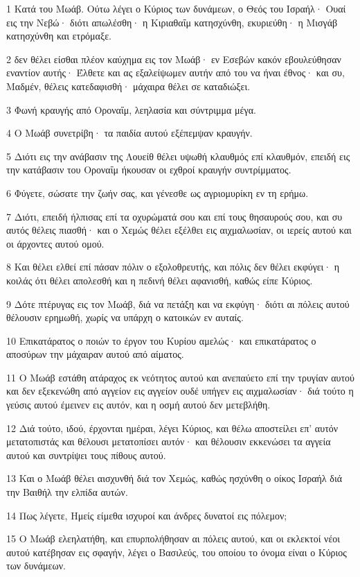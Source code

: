 \par 1 Κατά του Μωάβ. Ούτω λέγει ο Κύριος των δυνάμεων, ο Θεός του Ισραήλ· Ουαί εις την Νεβώ· διότι απωλέσθη· η Κιριαθαΐμ κατησχύνθη, εκυριεύθη· η Μισγάβ κατησχύνθη και ετρόμαξε.
\par 2 δεν θέλει είσθαι πλέον καύχημα εις τον Μωάβ· εν Εσεβών κακόν εβουλεύθησαν εναντίον αυτής· Έλθετε και ας εξαλείψωμεν αυτήν από του να ήναι έθνος· και συ, Μαδμέν, θέλεις κατεδαφισθή· μάχαιρα θέλει σε καταδιώξει.
\par 3 Φωνή κραυγής από Οροναΐμ, λεηλασία και σύντριμμα μέγα.
\par 4 Ο Μωάβ συνετρίβη· τα παιδία αυτού εξέπεμψαν κραυγήν.
\par 5 Διότι εις την ανάβασιν της Λουείθ θέλει υψωθή κλαυθμός επί κλαυθμόν, επειδή εις την κατάβασιν του Οροναΐμ ήκουσαν οι εχθροί κραυγήν συντρίμματος.
\par 6 Φύγετε, σώσατε την ζωήν σας, και γένεσθε ως αγριομυρίκη εν τη ερήμω.
\par 7 Διότι, επειδή ήλπισας επί τα οχυρώματά σου και επί τους θησαυρούς σου, και συ αυτός θέλεις πιασθή· και ο Χεμώς θέλει εξέλθει εις αιχμαλωσίαν, οι ιερείς αυτού και οι άρχοντες αυτού ομού.
\par 8 Και θέλει ελθεί επί πάσαν πόλιν ο εξολοθρευτής, και πόλις δεν θέλει εκφύγει· η κοιλάς ότι θέλει απολεσθή και η πεδινή θέλει αφανισθή, καθώς είπε Κύριος.
\par 9 Δότε πτέρυγας εις τον Μωάβ, διά να πετάξη και να εκφύγη· διότι αι πόλεις αυτού θέλουσιν ερημωθή, χωρίς να υπάρχη ο κατοικών εν αυταίς.
\par 10 Επικατάρατος ο ποιών το έργον του Κυρίου αμελώς· και επικατάρατος ο αποσύρων την μάχαιραν αυτού από αίματος.
\par 11 Ο Μωάβ εστάθη ατάραχος εκ νεότητος αυτού και ανεπαύετο επί την τρυγίαν αυτού και δεν εξεκενώθη από αγγείον εις αγγείον ουδέ υπήγεν εις αιχμαλωσίαν· διά τούτο η γεύσις αυτού έμεινεν εις αυτόν, και η οσμή αυτού δεν μετεβλήθη.
\par 12 Διά τούτο, ιδού, έρχονται ημέραι, λέγει Κύριος, και θέλω αποστείλει επ' αυτόν μετατοπιστάς και θέλουσι μετατοπίσει αυτόν· και θέλουσιν εκκενώσει τα αγγεία αυτού και συντρίψει τους πίθους αυτού.
\par 13 Και ο Μωάβ θέλει αισχυνθή διά τον Χεμώς, καθώς ησχύνθη ο οίκος Ισραήλ διά την Βαιθήλ την ελπίδα αυτών.
\par 14 Πως λέγετε, Ημείς είμεθα ισχυροί και άνδρες δυνατοί εις πόλεμον;
\par 15 Ο Μωάβ ελεηλατήθη, και επυρπολήθησαν αι πόλεις αυτού, και οι εκλεκτοί νέοι αυτού κατέβησαν εις σφαγήν, λέγει ο Βασιλεύς, του οποίου το όνομα είναι ο Κύριος των δυνάμεων.
